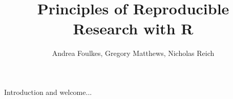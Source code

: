 

\title{Principles of Reproducible Research with R}
\newcommand{\ModuleShortname}{shortName}
\author{Andrea Foulkes, Gregory Matthews, Nicholas Reich}
\newcommand{\LicenseText}{Made available under the Creative Commons Attribution-ShareAlike 3.0 Unported License: http://creativecommons.org/licenses/by-sa/3.0/deed.en\textunderscore US }
\newcommand{\Instructor}{}
\newcommand{\Course}{Biostatistics in Practice: Research Training in High-Performance Computing with R}






\begin{frame}[plain]
	\titlepage
\end{frame}





\begin{frame}{Introduction and welcome...}

\end{frame}


